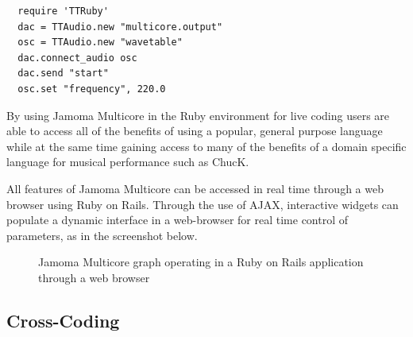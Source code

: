\documentclass[twoside,a4paper]{article}
\begin{document}
\begin{lstlisting}
  require 'TTRuby'
  dac = TTAudio.new "multicore.output"
  osc = TTAudio.new "wavetable"
  dac.connect_audio osc
  dac.send "start"
  osc.set "frequency", 220.0
\end{lstlisting}

By using Jamoma Multicore in the Ruby environment for live coding users are able to access all of the benefits of using a popular, general purpose language while at the same time gaining access to many of the benefits of a domain specific language for musical performance such as ChucK.


All features of Jamoma Multicore can be accessed in real time through a web browser using Ruby on Rails.  Through the use of AJAX, interactive widgets can populate a dynamic interface in a web-browser for real time control of parameters, as in the screenshot below.

\begin{figure}[htbp]
\centerline{}
\caption{Jamoma Multicore graph operating in a Ruby on Rails application through a web browser}
\label{fig:rails}
\end{figure}



\subsection{Cross-Coding} %
\end{document}
